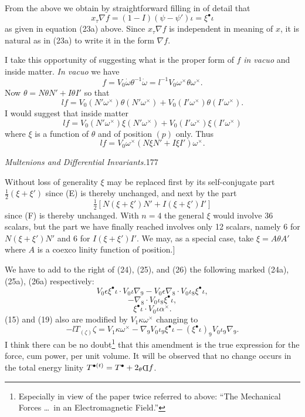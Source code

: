 \documentclass[11pt]{article}
\newcommand{\invd}{\mathord{\vcenter{\hbox{\rotatebox[origin=c]{180}{\(\mathrm{D}\)}}}}}
\newcommand{\thetaPi}{{}_\theta\invd}
\begin{document}
\indent From the above we obtain by straightforward filling in of detail that
\[
  x_\tau\nabla f=(1-I)(\psi-\psi')\iota=\xi^\bullet\iota
\]
as given in equation (23a) above. Since $x_\tau\nabla f$ is independent in meaning of $x$, it is natural as in (23a) to write it in the form $\nabla f$.

\indent I take this opportunity of suggesting what is the proper form of $f$ \emph{in vacuo} and inside matter. \emph{In vacuo} we have
\[
  f=V_0\dot\omega\theta^{-1}\dot\omega=l^{-1}V_0\omega^\times\theta\omega^\times.
\]
Now $\theta=N\theta N'+I\theta I'$ so that
\[
  lf=V_0(N'\omega^\times)\theta(N'\omega^\times)+V_0(I'\omega^\times)\theta(I'\omega^\times).
\]
I would suggest that inside matter
\begin{equation}
  lf=V_0(N'\omega^\times)\xi(N'\omega^\times)+V_0(I'\omega^\times)\xi(I'\omega^\times)
  \tag{E}
\end{equation}
where $\xi$ is a function of $\theta$ and of position $(p)$ only. Thus
\begin{equation}
  lf=V_0\omega^\times(N\xi N'+I\xi I')\omega^\times.
  \tag{F}
\end{equation}

\newpage\thispagestyle{empty}\begin{center}\textit{Multenions and Differential Invariants.}\hfill 177\end{center}
Without loss of generality $\xi$ may be replaced first by its self-conjugate part $\tfrac12(\xi+\xi')$ since (E) is thereby unchanged, and next by the part
\[
  \tfrac12[N(\xi+\xi')N'+I(\xi+\xi')I']
\]
since (F) is thereby unchanged. With $n=4$ the general $\xi$ would involve 36 scalars, but the part we have finally reached involves only 12 scalars, namely 6 for $N(\xi+\xi')N'$ and 6 for $I(\xi+\xi')I'$. We may, as a special case, take $\xi=A\theta A'$ where $A$ is a coexco linity function of position.]

\indent We have to add to the right of (24), (25), and (26) the following marked (24a), (25a), (26a) respectively:
\[
  V_0\epsilon\xi^\bullet\iota\mathbin{\cdot}V_0\iota\nabla_9-V_0\epsilon\nabla_8\mathbin{\cdot}V_0\iota_8\xi^\bullet\iota,\tag{24a}
\]
\[
  -\nabla_8\mathbin{\cdot}V_0\iota_8\xi^\bullet\iota,\tag{25a}
\]
\[
  \xi^\bullet\iota\mathbin{\cdot}V_0\iota\alpha^\times.\tag{26a}
\]
(15) and (19) also are modified by $V_1\kappa\omega^\times$ changing to
\[
  -lT_{(\zeta)}\zeta=V_1\kappa\omega^\times-\nabla_9V_0\iota_9\xi^\bullet\iota-(\xi^\bullet\iota)_9V_0\iota_9\nabla_9.\tag{15a and 19a}
\]
I think there can be no doubt\footnote{Especially in view of the paper twice referred to above: ``The Mechanical Forces \ldots\ in an Electromagnetic Field.''} that this amendment is the true expression for the force, cum power, per unit volume. It will be observed that no change occurs in the total energy linity $T^{\bullet(t)}=T^\bullet+2\thetaPi f$.
\end{document}
